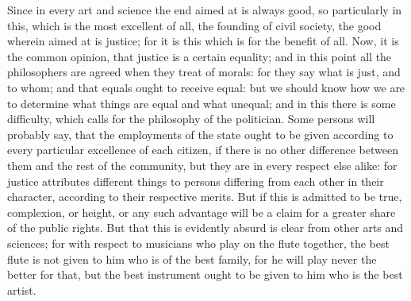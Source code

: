 
Since in every art and science the end aimed at is always good, so
particularly in this, which is the most excellent of all, the founding of
civil society, the good wherein aimed at is justice; for it is this which
is for the benefit of all. Now, it is the common opinion, that justice is
a certain equality; and in this point all the philosophers are agreed when
they treat of morals: for they say what is just, and to whom; and that
equals ought to receive equal: but we should know how we are to determine
what things are equal and what unequal; and in this there is some
difficulty, which calls for the philosophy of the politician. Some persons
will probably say, that the employments of the state ought to be given
according to every particular excellence of each citizen, if there is no
other difference between them and the rest of the community, but they are
in every respect else alike: for justice attributes different things to
persons differing from each other in their character, according to their
respective merits. But if this is admitted to be true, complexion, or
height, or any such advantage will be a claim for a greater share of the
public rights. But that this is evidently absurd is clear from other arts
and sciences; for with respect to musicians who play on the flute
together, the best flute is not given to him who is of the best family,
for he will play never the better for that, but the best instrument ought
to be given to him who is the best artist.

